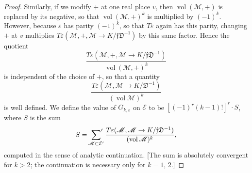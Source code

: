 \documentclass[12pt,a4paper]{article}
\theoremstyle{plain}
\theoremstyle{definition}
\theoremstyle{remark}
\DeclareMathOperator{\vol}{vol}
\begin{document}
\begin{proof}
Similarly, if we modify $+$ at one real place $v$, then $\vol(\mathscr{M}, +)$ is replaced by its negative, so that $\vol(\mathscr{M}, +)^k$ is multiplied by $(-1)^k$. However, because $\varepsilon$ has parity $(-1)^k$, so that $T\varepsilon$ again has this parity, changing $+$ at $v$ multiplies $T\varepsilon(\mathscr{M}, +, \mathscr{M} \to K/\mathfrak{f}\mathfrak{D}^{-1})$ by this same factor. Hence the quotient
\[
\frac{T\varepsilon(\mathscr{M}, +, \mathscr{M} \to K/\mathfrak{f}\mathfrak{D}^{-1})}{\vol(\mathscr{M}, +)^k}
\]
is independent of the choice of $+$, so that a quantity
\[
\frac{T\varepsilon(\mathscr{M}, \mathscr{M} \to K/\mathfrak{D}^{-1})}{(\vol \mathscr{M})^k}
\]
is well defined. We define the value of $G_{k,\varepsilon}$ on $\mathcal{E}$ to be $[(-1)^r(k-1)!]^r \cdot S$, where $S$ is the sum
\begin{equation}\label{eq:6.3}
S = \sideset{}{'}\sum_{\mathscr{M} \subset \mathcal{E}'} \frac{T\varepsilon(\mathscr{M}, \mathscr{M} \to K/\mathfrak{f}\mathfrak{D}^{-1})}{(\vol \mathscr{M})^k},
\end{equation}
computed in the sense of analytic continuation. [The sum is absolutely convergent for $k > 2$; the continuation is necessary only for $k = 1$, $2$.]


\end{proof}
\end{document}
